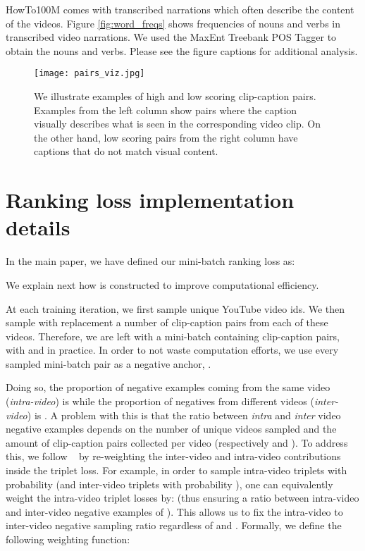 \documentclass[10pt,twocolumn,letterpaper]{article}
\begin{document}
HowTo100M comes with transcribed narrations which often describe the content of the videos.
Figure \ref{fig:word_freqs} shows frequencies of nouns and verbs in transcribed video narrations. 
We used the MaxEnt Treebank POS Tagger to obtain the nouns and verbs.
Please see the figure captions for additional analysis.

\begin{figure}[t]
\begin{center}
   \texttt{[image: pairs\_viz.jpg]}
   \caption{We illustrate examples of high and low scoring clip-caption pairs. 
   Examples from the left column show pairs where the caption visually describes what is seen in the corresponding video clip. On the other hand, low scoring pairs from the right column have captions that do not match visual content.}
   \label{fig:pairs_example}
\end{center}
\vspace{-0.2in}
\end{figure}

\section{Ranking loss implementation details}
\label{loss_detail}
In the main paper, we have defined our mini-batch ranking loss as:

We explain next how  is constructed to improve computational efficiency.

At each training iteration, we first sample  unique YouTube video ids.
We then sample with replacement a number  of clip-caption pairs from each of these videos.
Therefore, we are left with a mini-batch containing  clip-caption pairs, with  and  in practice.
In order to not waste computation efforts, we use every sampled mini-batch pair as a negative anchor, \ie .


Doing so, the proportion of negative examples coming from the same video (\emph{intra-video}) is  while the proportion of negatives from different videos (\emph{inter-video}) is . 
A problem with this is that the ratio between \emph{intra} and \emph{inter} video negative examples depends on the number of unique videos sampled and the amount of clip-caption pairs collected per video (respectively  and ). 
To address this, we follow ~\cite{hendricks17localizing} by re-weighting the inter-video and intra-video contributions inside the triplet loss. 
For example, in order to sample intra-video triplets with probability  (and inter-video triplets with probability ), one can equivalently weight the intra-video triplet losses by:  (thus ensuring a ratio between intra-video and inter-video negative examples of ).
This allows us to fix the intra-video to inter-video negative sampling ratio regardless of  and .
Formally, we define the following weighting function:
 
\end{document}
